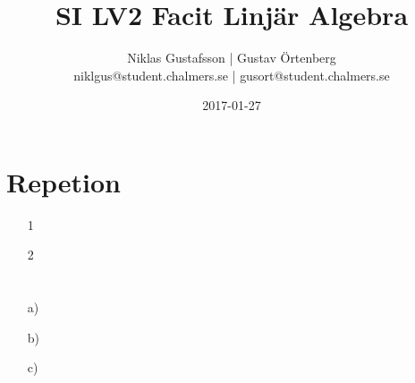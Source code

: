\documentclass{article}
\title{SI LV2 Facit Linjär Algebra}
\author{Niklas Gustafsson | Gustav Örtenberg  \\ \small{niklgus@student.chalmers.se} | \small{gusort@student.chalmers.se}}
\date{2017-01-27}
\begin{document}
\maketitle
\section*{Repetion}
\begin{itemize}
	\item[1] 
	\item[2] 
\end{itemize}

\section{}


\section{}
\begin{itemize}
	\item[a) ] 
	\item[b) ] 
	\item[c) ] 
\end{itemize}

\section{}


\section{}


\section{}


\section{}

\end{document}
